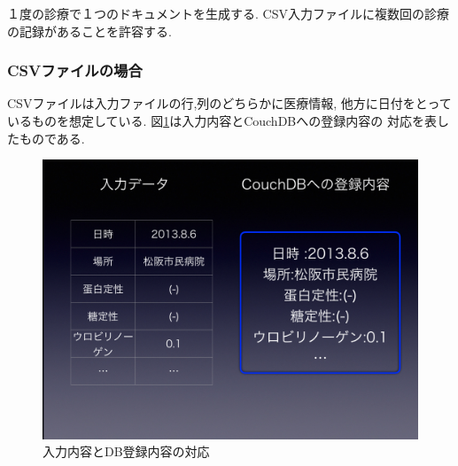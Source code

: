 	１度の診療で１つのドキュメントを生成する.
	CSV入力ファイルに複数回の診療の記録があることを許容する.

		\subsubsection{CSVファイルの場合}
			CSVファイルは入力ファイルの行,列のどちらかに医療情報,
			他方に日付をとっているものを想定している.
			図\ref{csv-data-trans}は入力内容とCouchDBへの登録内容の
			対応を表したものである.

			\begin{figure}[htbp]
				\begin{center}
					\includegraphics[width=15cm, bb=0 0 1435 1073, clip]{./gazou/csv-data-trans2.png}
				\end{center}
				\caption{入力内容とDB登録内容の対応}
				\label{csv-data-trans}
			\end{figure}

